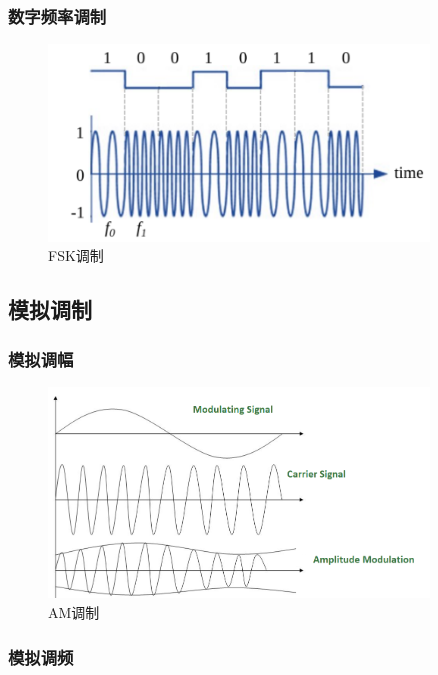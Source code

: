 \documentclass[lang=cn,newtx,10pt,scheme=chinese]{elegantbook}
\begin{document}
\subsubsection{数字频率调制}

\begin{figure}[!htb]
\centering
\includegraphics[width=0.9\textwidth]{fsk2.pdf}
\caption{FSK调制}
\label{fig:FSK}
\end{figure}

\subsection{模拟调制}

\subsubsection{模拟调幅}

\begin{figure}[!htb]
\centering
\includegraphics[width=0.9\textwidth]{Amplitue_Modulation.png}
\caption{AM调制}
\label{fig:AM-Modulation}
\end{figure}

\subsubsection{模拟调频}
\end{document}
